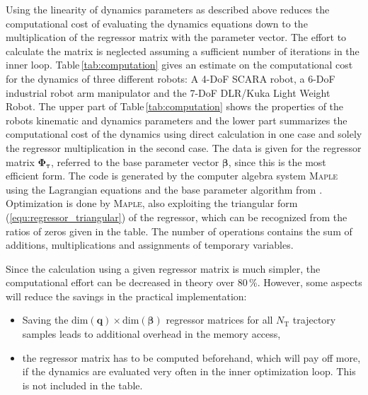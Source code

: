 \documentclass{svproc}
\newcommand{\bm}[1]{\boldsymbol{#1}}
\begin{document}
Using the linearity of dynamics parameters as described above reduces the computational cost of evaluating the dynamics equations down to the multiplication of the regressor matrix with the parameter vector.
The effort to calculate the matrix is neglected assuming a sufficient number of iterations in the inner loop.
Table\,\ref{tab:computation} gives an estimate on the computational cost for the dynamics of three different robots: A 4-DoF SCARA robot, a 6-DoF industrial robot arm manipulator and the 7-DoF DLR/Kuka Light Weight Robot.
The upper part of Table\,\ref{tab:computation} shows the properties of the robots kinematic and dynamics parameters and the lower part summarizes the computational cost of the dynamics using direct calculation in one case and solely the regressor multiplication in the second case.
The data is given for the regressor matrix $\bm{\Phi}_{\bm{\tau}}$, referred to the base parameter vector $\bm{\beta}$, since this is the most efficient form.
The code is generated by the computer algebra system \textsc{Maple} using the Lagrangian equations and the base parameter algorithm from \cite{KhalilDom2002}.
Optimization is done by \textsc{Maple}, also exploiting the triangular form (\ref{equ:regressor_triangular}) of the regressor, which can be recognized from the ratios of zeros given in the table.
The number of operations contains the sum of additions, multiplications and assignments of temporary variables. %

Since the calculation using a given regressor matrix is much simpler, the computational effort can be decreased in theory over 80\,\%.
However, some aspects will reduce the savings in the practical implementation:
\begin{itemize} 
\item Saving the $\mathrm{dim}(\bm{q}) \times \mathrm{dim}(\bm{\beta})$ regressor matrices for all $N_\mathrm{T}$ trajectory samples leads to additional overhead in the memory access,
\item the regressor matrix has to be computed beforehand, which will pay off more, if the dynamics are evaluated very often in the inner optimization loop. This is not included in the table.
\end{itemize}  

\end{document}
